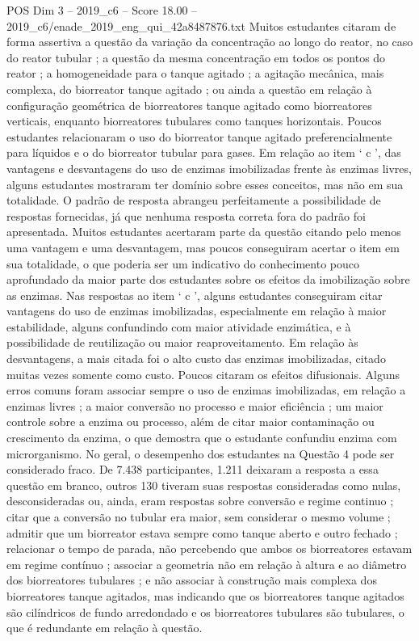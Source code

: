 \begin{textsample}{POS Dim 3 – 2019\_c6 – Score 18.00 – 2019\_c6/enade\_2019\_eng\_qui\_42a8487876.txt}
Muitos estudantes citaram de forma assertiva a questão da variação da concentração ao longo do reator, no caso do reator tubular ; a questão da mesma concentração em todos os pontos do reator ; a homogeneidade para o tanque agitado ; a agitação mecânica, mais complexa, do biorreator tanque agitado ; ou ainda a questão em relação à configuração geométrica de biorreatores tanque agitado como biorreatores verticais, enquanto biorreatores tubulares como tanques horizontais.
Poucos estudantes relacionaram o uso do biorreator tanque agitado preferencialmente para líquidos e o do biorreator tubular para gases.
Em relação ao item ‘ c ’, das vantagens e desvantagens do uso de enzimas imobilizadas frente às enzimas livres, alguns estudantes mostraram ter domínio sobre esses conceitos, mas não em sua totalidade.
O padrão de resposta abrangeu perfeitamente a possibilidade de respostas fornecidas, já que nenhuma resposta correta fora do padrão foi apresentada.
Muitos estudantes acertaram parte da questão citando pelo menos uma vantagem e uma desvantagem, mas poucos conseguiram acertar o item em sua totalidade, o que poderia ser um indicativo do conhecimento pouco aprofundado da maior parte dos estudantes sobre os efeitos da imobilização sobre as enzimas.
Nas respostas ao item ‘ c ’, alguns estudantes conseguiram citar vantagens do uso de enzimas imobilizadas, especialmente em relação à maior estabilidade, alguns confundindo com maior atividade enzimática, e à possibilidade de reutilização ou maior reaproveitamento.
Em relação às desvantagens, a mais citada foi o alto custo das enzimas imobilizadas, citado muitas vezes somente como custo.
Poucos citaram os efeitos difusionais.
Alguns erros comuns foram associar sempre o uso de enzimas imobilizadas, em relação a enzimas livres ; a maior conversão no processo e maior eficiência ; um maior controle sobre a enzima ou processo, além de citar maior contaminação ou crescimento da enzima, o que demostra que o estudante confundiu enzima com microrganismo.
No geral, o desempenho dos estudantes na Questão 4 pode ser considerado fraco.
De 7.438 participantes, 1.211 deixaram a resposta a essa questão em branco, outros 130 tiveram suas respostas consideradas como nulas, desconsideradas ou, ainda, eram respostas sobre conversão e regime continuo ; citar que a conversão no tubular era maior, sem considerar o mesmo volume ; admitir que um biorreator estava sempre como tanque aberto e outro fechado ; relacionar o tempo de parada, não percebendo que ambos os biorreatores estavam em regime contínuo ; associar a geometria não em relação à altura e ao diâmetro dos biorreatores tubulares ; e não associar à construção mais complexa dos biorreatores tanque agitados, mas indicando que os biorreatores tanque agitados são cilíndricos de fundo arredondado e os biorreatores tubulares são tubulares, o que é redundante em relação à questão.

\end{textsample}
